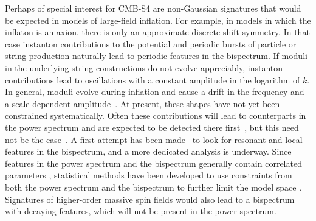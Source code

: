 Perhaps of special interest for CMB-S4 are non-Gaussian signatures that would be expected in models of large-field inflation. For example, in models in which the inflaton is an axion, there is only an approximate discrete shift symmetry. In that case instanton contributions to the potential and periodic bursts of particle or string production naturally lead to periodic features in the bispectrum. If moduli in the underlying string constructions do not evolve appreciably, instanton contributions lead to oscillations with a constant amplitude in the logarithm of $k$. In general, moduli evolve during inflation and cause a drift in the frequency and a scale-dependent amplitude~\cite{Flauger:2014ana}. At present, these shapes have not yet been constrained systematically. Often these contributions will lead to counterparts in the power spectrum and are expected to be detected there first~\cite{Behbahani:2011it}, but this need not be the case~\cite{Behbahani:2012be}. A first attempt has been made~\cite{Ade:2015ava} to look for resonant and local features in the bispectrum, and a more dedicated analysis is underway. Since features in the power spectrum and the bispectrum generally contain correlated parameters \cite{Meerburg:2009ys,Achucarro:2010da, Flauger:2010ja,Meerburg:2015yka,Achucarro:2012fd,Palma:2014hra}, statistical methods have been developed to use constraints from both the power spectrum and the bispectrum to further limit the model space \cite{Fergusson:2014hya,Meerburg:2015owa}. Signatures of higher-order massive spin fields \cite{Arkani-Hamed:2015bza,Chen:2015lza} would also lead to a bispectrum with decaying features, which will not be present in the power spectrum.


%



